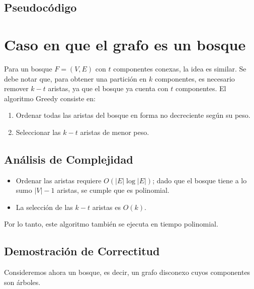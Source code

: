 \documentclass[12pt]{article}
\begin{document}
\subsection{Pseudocódigo}




\section{Caso en que el grafo es un bosque}
Para un bosque \( F = (V,E) \) con \( t \) componentes conexas, la idea es similar. Se debe notar que, para obtener una partición en \( k \) componentes, es necesario remover \( k-t \) aristas, ya que el bosque ya cuenta con \( t \) componentes. El algoritmo Greedy consiste en:
\begin{enumerate}
    \item Ordenar todas las aristas del bosque en forma no decreciente según su peso.
    \item Seleccionar las \( k-t \) aristas de menor peso.
\end{enumerate}


\subsection{Análisis de Complejidad}
\begin{itemize}
    \item Ordenar las aristas requiere \( O(|E| \log |E|) \); dado que el bosque tiene a lo sumo \( |V|-1 \) aristas, se cumple que es polinomial.
    \item La selección de las \( k-t \) aristas es \( O(k) \).
\end{itemize}
Por lo tanto, este algoritmo también se ejecuta en tiempo polinomial.

\subsection{Demostración de Correctitud}

Consideremos ahora un bosque, es decir, un grafo disconexo cuyos componentes son árboles.
\end{document}
